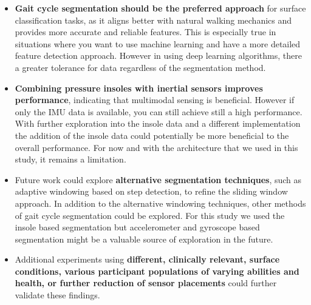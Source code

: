 \begin{itemize}
    \item \textbf{Gait cycle segmentation should be the preferred approach} for surface classification tasks, as it aligns better with natural walking mechanics and provides more accurate and reliable features. This is especially true in situations where you want to use machine learning and have a more detailed feature detection approach. However in using deep learning algorithms, there a greater tolerance for data regardless of the segmentation method.
    \item \textbf{Combining pressure insoles with inertial sensors improves performance}, indicating that multimodal sensing is beneficial. However if only the IMU data is available, you can still achieve still a high performance. With further exploration into the insole data and a different implementation the addition of the insole data could potentially be more beneficial to the overall performance. For now and with the architecture that we used in this study, it remains a limitation.
    \item Future work could explore \textbf{alternative segmentation techniques}, such as adaptive windowing based on step detection, to refine the sliding window approach. In addition to the alternative windowing techniques, other methods of gait cycle segmentation could be explored. For this study we used the insole based segmentation but accelerometer and gyroscope based segmentation might be a valuable source of exploration in the future.
    \item Additional experiments using \textbf{different, clinically relevant, surface conditions, various participant populations of varying abilities and health, or further reduction of sensor placements} could further validate these findings.
\end{itemize}

